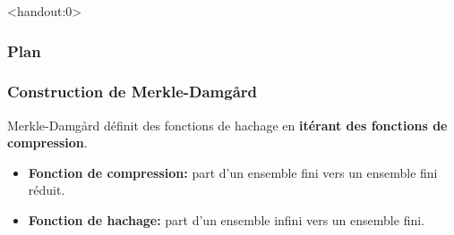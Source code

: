 \begin{frame}<handout:0>
  \frametitle{Plan}
  \tableofcontents[currentsection,subsectionstyle=hide]
\end{frame}

\begin{frame}[fragile]
  \frametitle{Construction de Merkle-Damg\r{a}rd}
  \vfill
 Merkle-Damg\r{a}rd définit des fonctions de hachage en \textbf{itérant des fonctions de compression}.
   \vfill
  \begin{itemize}
  \item{\textbf{Fonction de compression:} part d'un ensemble fini vers un ensemble fini réduit.}
  \vfill
  \item{\textbf{Fonction de hachage:} part d'un ensemble infini vers un ensemble fini.}
  \end{itemize}
  \vfill
\end{frame}

